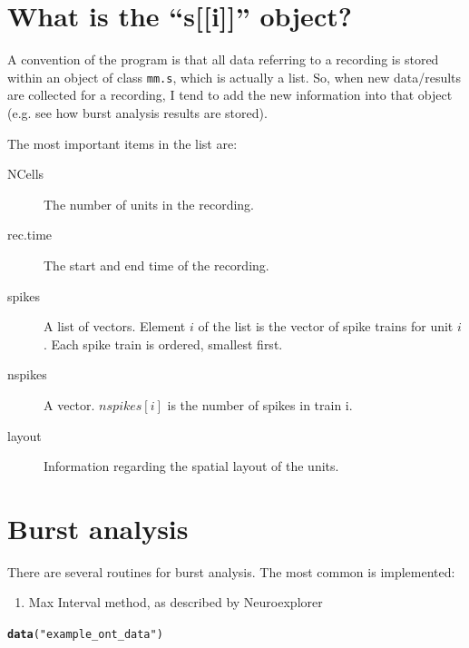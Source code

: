 \documentclass{article}\usepackage[]{graphicx}\usepackage[]{color}
\makeatletter
\newcommand{\hlstr}[1]{\textcolor[rgb]{0.192,0.494,0.8}{#1}}%
\newcommand{\hlstd}[1]{\textcolor[rgb]{0.345,0.345,0.345}{#1}}%
\newcommand{\hlkwd}[1]{\textcolor[rgb]{0.737,0.353,0.396}{\textbf{#1}}}%
\newenvironment{kframe}{%
 \def\at@end@of@kframe{}%
 \ifinner\ifhmode%
  \def\at@end@of@kframe{\end{minipage}}%
  \begin{minipage}{\columnwidth}%
 \fi\fi%
 \def\FrameCommand##1{\hskip\@totalleftmargin \hskip-\fboxsep
 \colorbox{shadecolor}{##1}\hskip-\fboxsep
     \hskip-\linewidth \hskip-\@totalleftmargin \hskip\columnwidth}%
 \MakeFramed {\advance\hsize-\width
   \@totalleftmargin\z@ \linewidth\hsize
   \@setminipage}}%
 {\par\unskip\endMakeFramed%
 \at@end@of@kframe}
\newenvironment{knitrout}{}{} %
\makeatother
\begin{document}
\section*{What is the ``s[[i]]'' object?}

A convention of the program is that all data referring to a recording
is stored within an object of class \texttt{mm.s}, which is actually a
list.  So, when new data/results are collected for a recording, I tend
to add the new information into that object (e.g. see how burst
analysis results are stored).

The most important items in the list are:
\begin{description}
\item[NCells] The number of units in the recording.
\item[rec.time] The start and end time of the recording.
\item[spikes] A list of vectors.  Element $i$ of the list is the
  vector of spike trains for unit $i$.  Each spike train is ordered, smallest first.
\item[nspikes] A vector.  $nspikes[i]$ is the number of spikes in
  train i.
\item[layout] Information regarding the spatial layout of the units.
\end{description}











\section*{Burst analysis}

There are several routines for burst analysis. The most common is implemented:

\begin{enumerate}
\item Max Interval method, as described by Neuroexplorer \citep{neuroexplorer}

\end{enumerate}

\begin{knitrout}
\color{fgcolor}\begin{kframe}
\begin{alltt}
\hlkwd{data}\hlstd{(}\hlstr{"example_ont_data"}\hlstd{)}
\end{alltt}
\end{kframe}
\end{knitrout}
\end{document}
